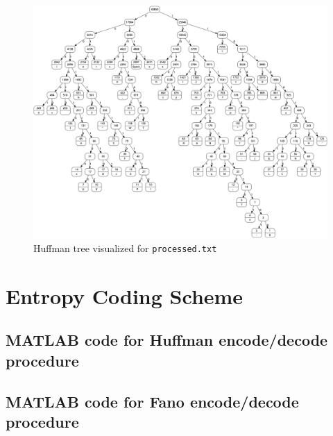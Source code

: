 \documentclass[12pt,twoside]{article}
\begin{document}
\begin{appendices}
\begin{figure}[h!]
    \centering
    \hspace*{-1.4cm}
    \includegraphics[width=1.15\textwidth]{huffmanTree_ame.png}
    \caption{Huffman tree visualized for \texttt{processed.txt}}
    \label{fig:huffmanTreeAME}
\end{figure}


\newpage
\section{Entropy Coding Scheme}
\subsection{MATLAB code for Huffman encode/decode procedure}
\label{app:huffman}




\newpage
\subsection{MATLAB code for Fano encode/decode procedure}
\label{app:fano}


\end{appendices}
\end{document}
